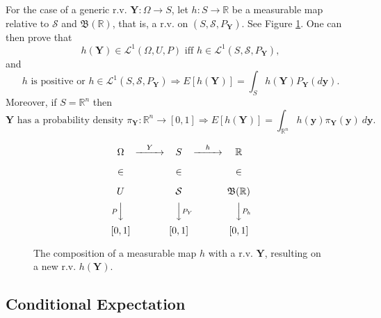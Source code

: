 For the case of a generic r.v. $\mathbf{Y}:\Omega\rightarrow S$,
let $h:S\rightarrow\mathbb{R}$ be a measurable map relative to $\mathcal{S}$ and $\mathfrak{B}(\mathbb{R})$, that is,
a r.v. on $(S,\mathcal{S},P_{\mathbf{Y}})$. See Figure \ref{fig-mcmc-hY-diagram}. One can then prove that \cite{JaPr04}
\begin{equation*}
h(\mathbf{Y})\in\mathcal{L}^1(\Omega,U,P)\mbox{ iff }h\in\mathcal{L}^1(S,\mathcal{S},P_{\mathbf{Y}}),
\end{equation*}
and
\begin{equation*}
h\mbox{ is positive or }h\in\mathcal{L}^1(S,\mathcal{S},P_{\mathbf{Y}})
\Rightarrow
E[h(\mathbf{Y})] = \int_S h(\mathbf{Y})P_{\mathbf{Y}}(d\mathbf{y}).
\end{equation*}
Moreover, if $S=\mathbb{R}^n$ then
\begin{equation*}
\mathbf{Y}\mbox{ has a probability density }\pi_{\mathbf{Y}}:\mathbb{R}^n\rightarrow [0,1]
\Rightarrow
E[h(\mathbf{Y})] = \int_{\mathbb{R}^n}h(\mathbf{y})\pi_{\mathbf{Y}}(\mathbf{y})~d\mathbf{y}.
\end{equation*}

\begin{figure}[h]
\[
\begin{CD}
\Omega   @>Y>> S           @>h>> \mathbb{R}              \\
\in      @.    \in         @.    \in                     \\
U        @.    \mathcal{S} @.    \mathfrak{B}(\mathbb{R})\\
@VP VV         @VVP_YV           @VVP_hV                 \\
[0,1]    @.    [0,1]       @.    [0,1]
\end{CD}
\]
\caption{The composition of a measurable map $h$ with a r.v. $\mathbf{Y}$,
resulting on a new r.v. $h(\mathbf{Y})$.
}
\label{fig-mcmc-hY-diagram}
\end{figure}

\subsection{Conditional Expectation}

